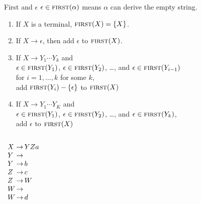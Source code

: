 \documentclass{plt}
\begin{document}
\begin{frame}{First and $\epsilon$}
  $\epsilon \in \textsc{first}(\alpha)$ means $\alpha$ can derive the empty
  string.

  \begin{enumerate}
\item If $X$ is a terminal, $\textsc{first}(X) = \{ X \}$.

\item If $X \rightarrow \epsilon$, then add $\epsilon$ to $\textsc{first}(X)$.

\item If $X \rightarrow Y_1 \cdots Y_k$ and \\
  $\epsilon \in \textsc{first}(Y_1)$,
  $\epsilon \in \textsc{first}(Y_2)$, \ldots, and $\epsilon \in
  \textsc{first}(Y_{i-1})$ \\ for $i=1,\ldots, k$ for some $k$, \\ \quad add
  $\textsc{first}(Y_i) - \{ \epsilon \}$ to $\textsc{first}(X)$

\item If $X \rightarrow Y_1 \cdots Y_K$ and \\
  $\epsilon \in \textsc{first}(Y_1)$,
  $\epsilon \in \textsc{first}(Y_2)$, \ldots, and $\epsilon \in \textsc{first}(Y_k)$, \\ \quad add
  $\epsilon$ to $\textsc{first}(X)$
      \end{enumerate}

  \begin{columns}
    \begin{column}{0.15\textwidth}
      $\begin{array}{l@{\,}l@{\,}l}
        X & \rightarrow & Y Z a \\
        Y & \rightarrow & \\
        Y & \rightarrow & b \\
        Z & \rightarrow & c \\
        Z & \rightarrow & W \\
        W & \rightarrow & \\
        W & \rightarrow & d \\
      \end{array}$
    \end{column}
\end{columns}
\end{frame}
\end{document}
